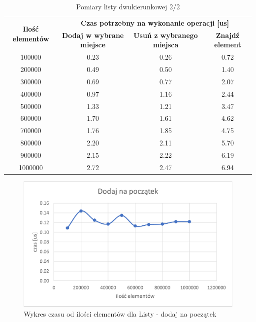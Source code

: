 \documentclass{article}
\begin{document}
    \begin{table}[H]
        \centering
        \begin{tabular}{|c|ccc|}
            \hline
            \multirow{2}{*}{\textbf{Ilość   elementów}} & \multicolumn{3}{c|}{\textbf{Czas   potrzebny na wykonanie operacji {[}us{]}}} \\ \cline{2-4} 
             & \multicolumn{1}{c|}{\textbf{Dodaj w wybrane miejsce}} & \multicolumn{1}{c|}{\textbf{Usuń z wybranego   miejsca}} & \textbf{Znajdź element} \\ \hline
            100000 & \multicolumn{1}{c|}{0.23} & \multicolumn{1}{c|}{0.26} & 0.72 \\ \hline
            200000 & \multicolumn{1}{c|}{0.49} & \multicolumn{1}{c|}{0.50} & 1.40 \\ \hline
            300000 & \multicolumn{1}{c|}{0.69} & \multicolumn{1}{c|}{0.77} & 2.07 \\ \hline
            400000 & \multicolumn{1}{c|}{0.97} & \multicolumn{1}{c|}{1.16} & 2.44 \\ \hline
            500000 & \multicolumn{1}{c|}{1.33} & \multicolumn{1}{c|}{1.21} & 3.47 \\ \hline
            600000 & \multicolumn{1}{c|}{1.70} & \multicolumn{1}{c|}{1.61} & 4.62 \\ \hline
            700000 & \multicolumn{1}{c|}{1.76} & \multicolumn{1}{c|}{1.85} & 4.75 \\ \hline
            800000 & \multicolumn{1}{c|}{2.20} & \multicolumn{1}{c|}{2.11} & 5.70 \\ \hline
            900000 & \multicolumn{1}{c|}{2.15} & \multicolumn{1}{c|}{2.22} & 6.19 \\ \hline
            1000000 & \multicolumn{1}{c|}{2.72} & \multicolumn{1}{c|}{2.47} & 6.94 \\ \hline
        \end{tabular}
        \caption{Pomiary listy dwukierunkowej 2/2}
    \end{table}


    \begin{figure}[H]
        \centering
        \includegraphics[scale = 0.85]{wykresy/table/addFirst.png}
        \caption{Wykres czasu od ilości elementów dla Listy - dodaj na początek}
    \end{figure}
\end{document}
